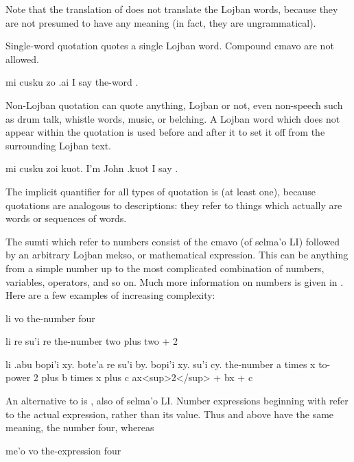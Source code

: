 Note that the translation of  does not translate the Lojban words, because they are
    not presumed to have any meaning (in fact, they are
    ungrammatical).

Single-word quotation quotes a single Lojban word. Compound
    cmavo are not allowed.
\begin{example}
mi cusku zo .ai\n
I say the-word .
\end{example}

Non-Lojban quotation can quote anything, Lojban or not, even
    non-speech such as drum talk, whistle words, music, or
    belching. A Lojban word which does not appear within the
    quotation is used before and after it to set it off from the
    surrounding Lojban text.
\begin{example}
mi cusku zoi kuot. I'm John .kuot\n
I say .
\end{example}

The implicit quantifier for all types of quotation is 
    (at least one), because quotations are analogous to 
    descriptions: they refer to things which actually are words or
    sequences of words.



The sumti which refer to numbers consist of the cmavo 
    (of selma'o LI) followed by an arbitrary Lojban mekso, or
    mathematical expression. This can be anything from a simple
    number up to the most complicated combination of numbers,
    variables, operators, and so on. Much more information on
    numbers is given in . Here
    are a few examples of increasing complexity:
\begin{example}
li vo\n
the-number four
\end{example}

\begin{example}
li re su'i re\n
the-number two plus two + 2
\end{example}

\begin{example}
li .abu bopi'i xy. bote'a re\n
\T	su'i by. bopi'i xy. su'i cy.\n
the-number a times x to-power 2\n
\T	plus b times x plus c\n
ax<sup>2</sup>  + bx + c
\end{example}

An alternative to  is , also of selma'o LI.
    Number expressions beginning with  refer to the actual
    expression, rather than its value. Thus  and  above have the same meaning, the number four, whereas
\begin{example}
me'o vo\n
the-expression four\n
{}
\end{example}

